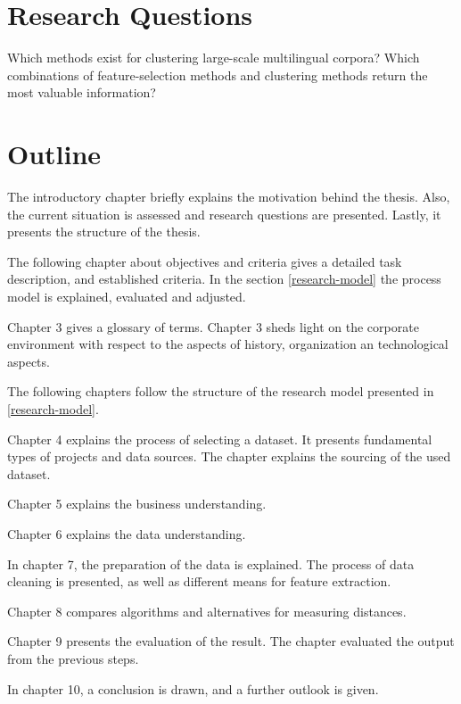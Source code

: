 \section{Research Questions}
Which methods exist for clustering large-scale multilingual corpora? Which combinations of feature-selection methods and clustering methods return the most valuable information?

\section{Outline}
The introductory chapter briefly explains the motivation behind the thesis. Also, the current situation is assessed and research questions are presented. Lastly, it presents the structure of the thesis.

The following chapter about objectives and criteria gives a detailed task description, and established criteria. In the section \ref{research-model} the process model is explained, evaluated and adjusted.

Chapter 3 gives a glossary of terms. Chapter 3 sheds light on the corporate environment with respect to the aspects of history, organization an technological aspects. 

The following chapters follow the structure of the research model presented in \ref{research-model}.

Chapter 4 explains the process of selecting a dataset. It presents fundamental types of projects and data sources. The chapter explains the sourcing of the used dataset.

Chapter 5 explains the business understanding.

Chapter 6 explains the data understanding.

In chapter 7, the preparation of the data is explained. The process of data cleaning is presented, as well as different means for feature extraction.

Chapter 8 compares algorithms and alternatives for measuring distances.

Chapter 9 presents the evaluation of the result. The chapter evaluated the output from the previous steps.

In chapter 10, a conclusion is drawn, and a further outlook is given.